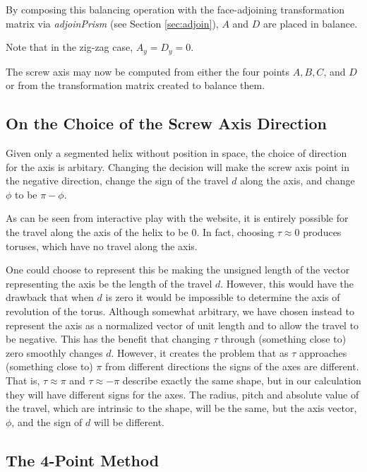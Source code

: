 \documentclass[11pt]{article}
\newenvironment{sketch}{%
  \renewcommand{\proofname}{Proof Sketch}\proof}{\endproof}
\begin{document}
{\begin{sketch}
By composing this balancing operation with the face-adjoining transformation
matrix via {\em adjoinPrism} (see Section \ref{sec:adjoin}), $A$ and $D$ are placed in balance.

Note that in the zig-zag case, $A_y = D_y = 0$.

\end{sketch}

The screw axis may now
be computed from either the four points $A,B,C$, and $D$ or from the transformation
matrix created to balance them.

\subsection{On the Choice of the Screw Axis Direction}

Given only a segmented helix without position in space,
the choice of
direction for the axis is arbitary.
Changing the decision will make the screw axis point in the negative direction,
change the sign of the travel $d$ along the axis, and change $\phi$ to be $\pi - \phi$.

As can be seen from interactive play with the website\cite{segmentedhelixinteractive},
it is entirely possible for the travel along
the axis of the helix to be $0$. In fact, choosing $\tau \approx 0$ produces toruses, which have no
travel along the axis.

One could choose to represent this be making the unsigned length of the vector
representing the axis be the length of the
travel $d$.
However, this would have the drawback that when $d$ is zero it would be impossible to determine
the axis of revolution of the torus.
Although somewhat arbitrary, we have chosen instead to represent the
axis as a normalized vector of unit length
and to allow the travel to be negative. This has the benefit that
changing $\tau$ through (something close to)
zero smoothly changes $d$. However, it creates the problem that as $\tau$ approaches
(something close to) $\pi$ from different directions the signs of the axes are different.
That is, $\tau \approx \pi$ and $\tau \approx -\pi$ describe exactly
the same shape, but in our calculation
they will have different signs for the axes. The radius, pitch and
absolute value of the travel,
which are intrinsic to the shape, will be the same,
but the axis vector, $\phi$, and the sign of $d$ will be different.

\subsection{The 4-Point Method}

}
\end{document}
